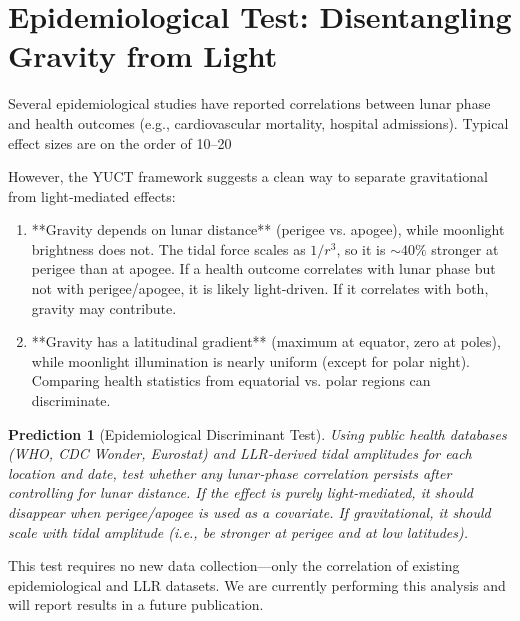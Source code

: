 \documentclass[12pt,a4paper]{article}
\newtheorem{prediction}[theorem]{Prediction}
\theoremstyle{remark}
\begin{document}
	\section{Epidemiological Test: Disentangling Gravity from Light}
	\label{sec:epidemiology}
	
	Several epidemiological studies have reported correlations between lunar phase and health outcomes (e.g., cardiovascular mortality, hospital admissions). Typical effect sizes are on the order of 10–20 %
	
	However, the YUCT framework suggests a clean way to separate gravitational from light‑mediated effects:
	
	\begin{enumerate}
		\item **Gravity depends on lunar distance** (perigee vs. apogee), while moonlight brightness does not. The tidal force scales as \(1/r^3\), so it is \(\sim 40\%\) stronger at perigee than at apogee. If a health outcome correlates with lunar phase but not with perigee/apogee, it is likely light‑driven. If it correlates with both, gravity may contribute.
		\item **Gravity has a latitudinal gradient** (maximum at equator, zero at poles), while moonlight illumination is nearly uniform (except for polar night). Comparing health statistics from equatorial vs. polar regions can discriminate.
	\end{enumerate}
	
	\begin{prediction}[Epidemiological Discriminant Test]
		Using public health databases (WHO, CDC Wonder, Eurostat) and LLR‑derived tidal amplitudes for each location and date, test whether any lunar‑phase correlation persists after controlling for lunar distance. If the effect is purely light‑mediated, it should disappear when perigee/apogee is used as a covariate. If gravitational, it should scale with tidal amplitude (i.e., be stronger at perigee and at low latitudes).
	\end{prediction}
	
	This test requires no new data collection—only the correlation of existing epidemiological and LLR datasets. We are currently performing this analysis and will report results in a future publication.
	
\end{document}
